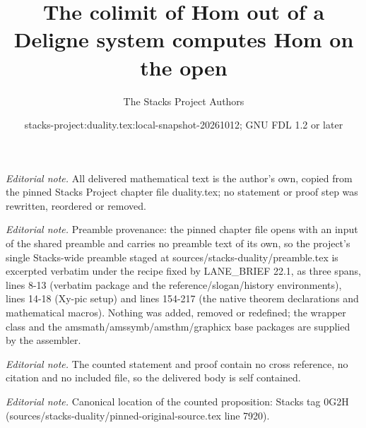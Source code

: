 \documentclass[10pt,a4paper]{amsart}
\title{The colimit of Hom out of a Deligne system computes Hom on the open}
\author{The Stacks Project Authors}
\date{stacks-project:duality.tex:local-snapshot-20261012; GNU FDL 1.2 or later}
\theoremstyle{plain}
\theoremstyle{definition}
\theoremstyle{remark}
\numberwithin{equation}{subsection}
\begin{document}
\maketitle
\noindent\textit{Editorial note.} All delivered mathematical text is the author's own, copied from the pinned Stacks Project chapter file duality.tex; no statement or proof step was rewritten, reordered or removed.\par\medskip
\noindent\textit{Editorial note.} Preamble provenance: the pinned chapter file opens with an input of the shared preamble and carries no preamble text of its own, so the project's single Stacks-wide preamble staged at sources/stacks-duality/preamble.tex is excerpted verbatim under the recipe fixed by LANE\_BRIEF 22.1, as three spans, lines 8-13 (verbatim package and the reference/slogan/history environments), lines 14-18 (Xy-pic setup) and lines 154-217 (the native theorem declarations and mathematical macros). Nothing was added, removed or redefined; the wrapper class and the amsmath/amssymb/amsthm/graphicx base packages are supplied by the assembler.\par\medskip
\noindent\textit{Editorial note.} The counted statement and proof contain no cross reference, no citation and no included file, so the delivered body is self contained.\par\medskip
\noindent\textit{Editorial note.} Canonical location of the counted proposition: Stacks tag 0G2H (sources/stacks-duality/pinned-original-source.tex line 7920).\par\medskip
\end{document}
